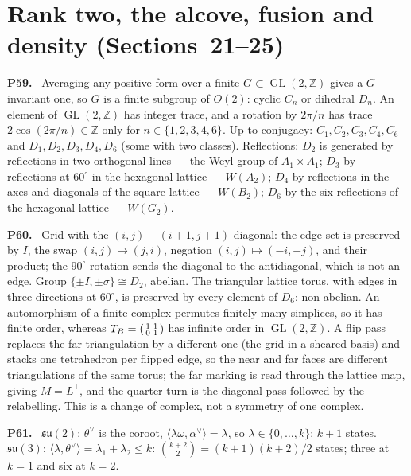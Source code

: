 \documentclass[11pt]{article}
\newcommand{\Z}{\mathbb{Z}}
\newcommand{\GL}{\operatorname{GL}}
\newenvironment{solution}[1]{\medskip\noindent\textbf{P#1.}\ }{\par\medskip}
\begin{document}
\section*{Rank two, the alcove, fusion and density (Sections~21--25)}

\begin{solution}{59}
Averaging any positive form over a finite $G\subset\GL(2,\Z)$ gives a
$G$-invariant one, so $G$ is a finite subgroup of $O(2)$: cyclic $C_n$ or
dihedral $D_n$. An element of $\GL(2,\Z)$ has integer trace, and a rotation by
$2\pi/n$ has trace $2\cos(2\pi/n)\in\Z$ only for $n\in\{1,2,3,4,6\}$. Up to
conjugacy: $C_1,C_2,C_3,C_4,C_6$ and $D_1,D_2,D_3,D_4,D_6$ (some with two
classes). Reflections: $D_2$ is generated by reflections in two orthogonal
lines --- the Weyl group of $A_1\times A_1$; $D_3$ by reflections at $60^\circ$
in the hexagonal lattice --- $W(A_2)$; $D_4$ by reflections in the axes and
diagonals of the square lattice --- $W(B_2)$; $D_6$ by the six reflections of
the hexagonal lattice --- $W(G_2)$.
\end{solution}

\begin{solution}{60}
Grid with the $(i,j)\!-\!(i{+}1,j{+}1)$ diagonal: the edge set is preserved by
$I$, the swap $(i,j)\mapsto(j,i)$, negation $(i,j)\mapsto(-i,-j)$, and their
product; the $90^\circ$ rotation sends the diagonal to the antidiagonal, which
is not an edge. Group $\{\pm I,\pm\sigma\}\cong D_2$, abelian. The triangular
lattice torus, with edges in three directions at $60^\circ$, is preserved by
every element of $D_6$: non-abelian. An automorphism of a finite complex
permutes finitely many simplices, so it has finite order, whereas
$T_B = \begin{psmallmatrix}1&1\\0&1\end{psmallmatrix}$ has infinite order in
$\GL(2,\Z)$. A flip pass replaces the far triangulation by a different one
(the grid in a sheared basis) and stacks one tetrahedron per flipped edge, so
the near and far faces are different triangulations of the same torus; the
far marking is read through the lattice map, giving $M = L^{\mathsf T}$, and
the quarter turn is the diagonal pass followed by the relabelling. This is a
change of complex, not a symmetry of one complex.
\end{solution}

\begin{solution}{61}
$\mathfrak{su}(2)$: $\theta^\vee$ is the coroot, $\langle\lambda\omega,\alpha^\vee\rangle = \lambda$,
so $\lambda\in\{0,\dots,k\}$: $k+1$ states. $\mathfrak{su}(3)$:
$\langle\lambda,\theta^\vee\rangle = \lambda_1+\lambda_2\le k$: $\binom{k+2}{2} = (k+1)(k+2)/2$
states; three at $k = 1$ and six at $k = 2$.
\end{solution}
\end{document}
